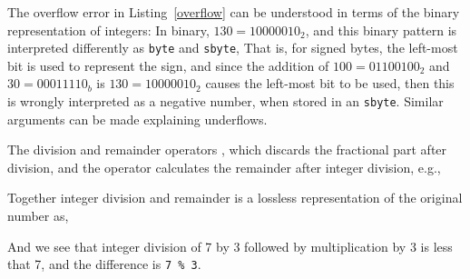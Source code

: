 
The overflow error in Listing~\ref{overflow} can be understood in terms of the binary representation of integers: In binary, $130=10000010_2$, and this binary pattern is interpreted differently as \lstinline{byte} and \lstinline{sbyte},
%
%
%
That is, for signed bytes, the left-most bit is used to represent the sign, and since the addition of $100=01100100_2$ and $30=00011110_b$ is $130=10000010_2$ causes the left-most bit to be used, then this is wrongly interpreted as a negative number, when stored in an \lstinline{sbyte}. Similar arguments can be made explaining underflows.

The division and remainder operators , which discards the fractional part after division, and the  operator calculates the remainder after integer division, e.g.,
%

%
Together integer division and remainder is a lossless representation of the original number as,
%

%
And we see that integer division of 7 by 3 followed by multiplication by 3 is less that 7, and the difference is \lstinline!7 % 3!.

